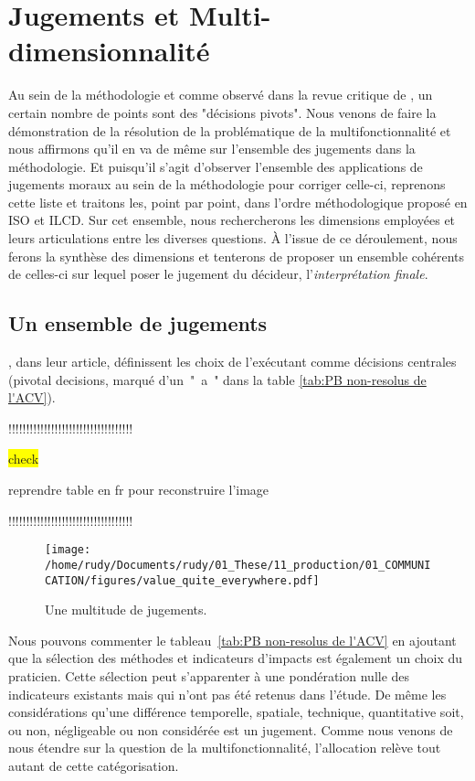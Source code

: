 \chapter{Jugements et Multi-dimensionnalité}
\label{chap:Jugements et Multi-dimensionnalité} %
Au sein de la méthodologie et comme observé dans la revue critique de \citeauthor{reap_survey_2008}, un certain nombre de points sont des "décisions pivots".
Nous venons de faire la démonstration de la résolution de la problématique de la multifonctionnalité et nous affirmons qu'il en va de même sur l'ensemble des jugements dans la méthodologie.
Et puisqu'il s'agit d'observer l'ensemble des applications de jugements moraux au sein de la méthodologie pour corriger celle-ci, reprenons cette liste et traitons les, point par point, dans l'ordre méthodologique proposé en ISO et ILCD.
Sur cet ensemble, nous rechercherons les dimensions employées et leurs articulations entre les diverses questions.
À l'issue de ce déroulement, nous ferons la synthèse des dimensions et tenterons de proposer un ensemble cohérents de celles-ci sur lequel poser le jugement du décideur, l'\emph{interprétation finale}.

\section{Un ensemble de jugements}
%

 \citeauthor{reap_survey_2008}, dans leur article, définissent les choix de l'exécutant comme décisions centrales (pivotal decisions, marqué d'un~"~a~" dans la table \ref{tab:PB non-resolus de l'ACV}).
 
!!!!!!!!!!!!!!!!!!!!!!!!!!!!!!!!!!!

 \colorbox{yellow}{check}
 
 reprendre table en fr pour reconstruire l'image
 
!!!!!!!!!!!!!!!!!!!!!!!!!!!!!!!!!!!
 
  \begin{figure}[h]
    \centering
    \texttt{[image: /home/rudy/Documents/rudy/01\_These/11\_production/01\_COMMUNICATION/figures/value\_quite\_everywhere.pdf]}
    \caption{Une multitude de jugements.}
    \label{fig:multitude_jugements}
  \end{figure}
Nous pouvons commenter le tableau~\ref{tab:PB non-resolus de l'ACV} en ajoutant que la sélection des méthodes et indicateurs d'impacts est également un choix du praticien.
Cette sélection peut s'apparenter à une pondération nulle des indicateurs existants mais qui n'ont pas été retenus dans l'étude.
De même les considérations qu'une différence temporelle, spatiale, technique, quantitative soit, ou non, négligeable ou non considérée est un jugement.
Comme nous venons de nous étendre sur la question de la multifonctionnalité, l'allocation relève tout autant de cette catégorisation.

